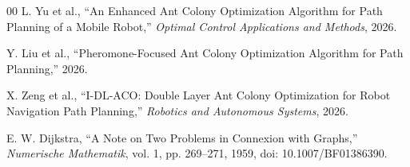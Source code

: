 \documentclass[conference]{IEEEtran}
\begin{document}
\begin{thebibliography}{00}
L. Yu et al.,
``An Enhanced Ant Colony Optimization Algorithm for Path Planning of a Mobile Robot,''
\textit{Optimal Control Applications and Methods},
2026.

Y. Liu et al.,
``Pheromone-Focused Ant Colony Optimization Algorithm for Path Planning,''
2026.

X. Zeng et al.,
``I-DL-ACO: Double Layer Ant Colony Optimization for Robot Navigation Path Planning,''
\textit{Robotics and Autonomous Systems},
2026.

E. W. Dijkstra, ``A Note on Two Problems in Connexion with Graphs,''
\textit{Numerische Mathematik}, vol. 1, pp. 269--271, 1959,
doi: 10.1007/BF01386390.

\end{thebibliography}
\end{document}
